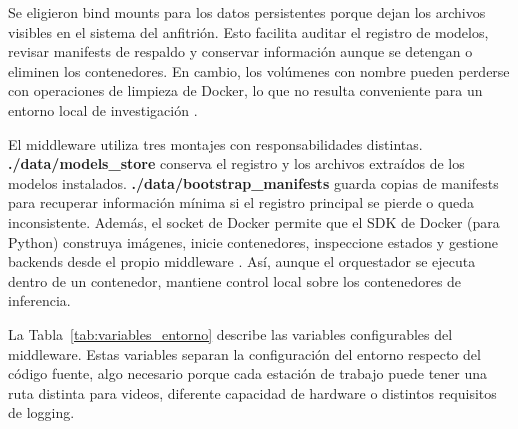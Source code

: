\documentclass[11pt,a4paper]{article}
\begin{document}
Se eligieron bind mounts para los datos persistentes porque dejan los archivos visibles en el sistema del anfitrión. Esto facilita auditar el registro de modelos, revisar manifests de respaldo y conservar información aunque se detengan o eliminen los contenedores. En cambio, los volúmenes con nombre pueden perderse con operaciones de limpieza de Docker, lo que no resulta conveniente para un entorno local de investigación \cite{docker2026overview}.

El middleware utiliza tres montajes con responsabilidades distintas. \textbf{./data/models\_store} conserva el registro y los archivos extraídos de los modelos instalados. \textbf{./data/bootstrap\_manifests} guarda copias de manifests para recuperar información mínima si el registro principal se pierde o queda inconsistente. Además, el socket de Docker permite que el SDK de Docker (para Python) construya imágenes, inicie contenedores, inspeccione estados y gestione backends desde el propio middleware \cite{docker_sdk_python}. Así, aunque el orquestador se ejecuta dentro de un contenedor, mantiene control local sobre los contenedores de inferencia.

La Tabla~\ref{tab:variables_entorno} describe las variables configurables del middleware. Estas variables separan la configuración del entorno respecto del código fuente, algo necesario porque cada estación de trabajo puede tener una ruta distinta para videos, diferente capacidad de hardware o distintos requisitos de logging.
\end{document}
